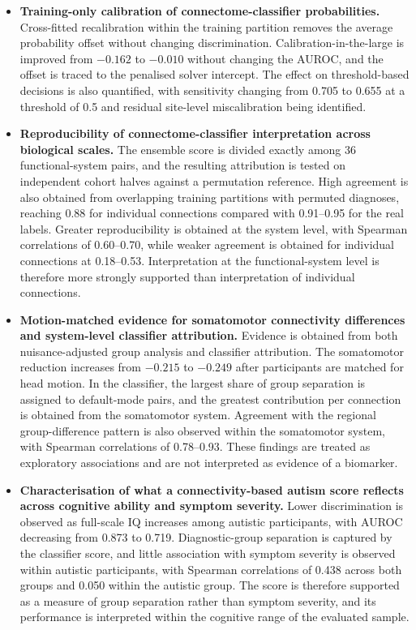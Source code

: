 \begin{itemize}

\item \textbf{Training-only calibration of connectome-classifier probabilities.} Cross-fitted recalibration within the training partition removes the average probability offset without changing discrimination. Calibration-in-the-large is improved from $-0.162$ to $-0.010$ without changing the AUROC, and the offset is traced to the penalised solver intercept. The effect on threshold-based decisions is also quantified, with sensitivity changing from 0.705 to 0.655 at a threshold of 0.5 and residual site-level miscalibration being identified.

\item \textbf{Reproducibility of connectome-classifier interpretation across biological scales.} The ensemble score is divided exactly among 36 functional-system pairs, and the resulting attribution is tested on independent cohort halves against a permutation reference. High agreement is also obtained from overlapping training partitions with permuted diagnoses, reaching 0.88 for individual connections compared with 0.91--0.95 for the real labels. Greater reproducibility is obtained at the system level, with Spearman correlations of 0.60--0.70, while weaker agreement is obtained for individual connections at 0.18--0.53. Interpretation at the functional-system level is therefore more strongly supported than interpretation of individual connections.

\item \textbf{Motion-matched evidence for somatomotor connectivity differences and system-level classifier attribution.} Evidence is obtained from both nuisance-adjusted group analysis and classifier attribution. The somatomotor reduction increases from $-0.215$ to $-0.249$ after participants are matched for head motion. In the classifier, the largest share of group separation is assigned to default-mode pairs, and the greatest contribution per connection is obtained from the somatomotor system. Agreement with the regional group-difference pattern is also observed within the somatomotor system, with Spearman correlations of 0.78--0.93. These findings are treated as exploratory associations and are not interpreted as evidence of a biomarker.

\item \textbf{Characterisation of what a connectivity-based autism score reflects across cognitive ability and symptom severity.} Lower discrimination is observed as full-scale IQ increases among autistic participants, with AUROC decreasing from 0.873 to 0.719. Diagnostic-group separation is captured by the classifier score, and little association with symptom severity is observed within autistic participants, with Spearman correlations of 0.438 across both groups and 0.050 within the autistic group. The score is therefore supported as a measure of group separation rather than symptom severity, and its performance is interpreted within the cognitive range of the evaluated sample.


\end{itemize}

